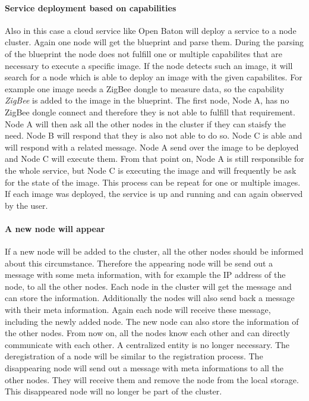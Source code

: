 \paragraph{Service deployment based on capabilities}
Also in this case a cloud service like Open Baton will deploy a service to a node cluster.
Again one node will get the blueprint and parse them.
During the parsing of the blueprint the node does not fulfill one or multiple capabilites that are necessary to execute a specific image.
If the node detects such an image, it will search for a node which is able to deploy an image with the given capabilites.
For example one image needs a ZigBee dongle to measure data, so the capability \textit{ZigBee} is added to the image in the blueprint.
The first node, Node A, has no ZigBee dongle connect and therefore they is not able to fulfill that requirement.
Node A will then ask all the other nodes in the cluster if they can staisfy the need.
Node B will respond that they is also not able to do so.
Node C is able and will respond with a related message.
Node A send over the image to be deployed and Node C will execute them.
From that point on, Node A is still responsible for the whole service, but Node C is executing the image and will frequently be ask for the state of the image.
This process can be repeat for one or multiple images.
If each image was deployed, the service is up and running and can again observed by the user.

\paragraph{A new node will appear}
If a new node will be added to the cluster, all the other nodes should be informed about this circumstance.
Therefore the appearing node will be send out a message with some meta information, with for example the \ac{IP} address of the node, to all the other nodes.
Each node in the cluster will get the message and can store the information.
Additionally the nodes will also send back a message with their meta information.
Again each node will receive these message, including the newly added node.
The new node can also store the information of the other nodes.
From now on, all the nodes know each other and can directly communicate with each other.
A centralized entity is no longer necessary.
The deregistration of a node will be similar to the registration process.
The disappearing node will send out a message with meta informations to all the other nodes.
They will receive them and remove the node from the local storage.
This disappeared node will no longer be part of the cluster.

